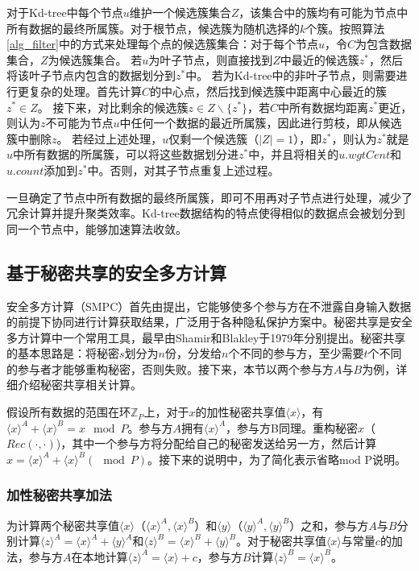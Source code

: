 对于Kd-tree中每个节点$ u $维护一个候选簇集合$ Z $，该集合中的簇均有可能为节点中所有数据的最终所属簇。对于根节点，候选簇为随机选择的$ k $个簇。按照算法\ref{alg_filter}中的方式来处理每个点的候选簇集合：对于每个节点$ u $，令$ C $为包含数据集合，$ Z $为候选簇集合。
若$ u $为叶子节点，则直接找到$ Z $中最近的候选簇$ z^* $，然后将该叶子节点内包含的数据划分到$ z^* $中。
若为Kd-tree中的非叶子节点，则需要进行更复杂的处理。首先计算$ C $的中心点，然后找到候选簇中距离中心最近的簇$ z^*\in Z $。
接下来，对比剩余的候选簇$ z\in Z\backslash\{z^*\} $，若$ C $中所有数据均距离$ z^* $更近，则认为$ z $不可能为节点$ u $中任何一个数据的最近所属簇，因此进行剪枝，即从候选簇中删除$ z $。
若经过上述处理，$ u $仅剩一个候选簇（$ |Z|=1 $），即$ z^* $，则认为$ z^* $就是$ u $中所有数据的所属簇，可以将这些数据划分进$ z^* $中，并且将相关的$ u.wgtCent $和$ u.count $添加到$ z^* $中。否则，对其子节点重复上述过程。

一旦确定了节点中所有数据的最终所属簇，即可不用再对子节点进行处理，减少了冗余计算并提升聚类效率。Kd-tree数据结构的特点使得相似的数据点会被划分到同一个节点中，能够加速算法收敛。

\subsection{基于秘密共享的安全多方计算}
安全多方计算（SMPC）首先由\cite{yao1986generate}提出，它能够使多个参与方在不泄露自身输入数据的前提下协同进行计算获取结果，广泛用于各种隐私保护方案中。秘密共享是安全多方计算中一个常用工具，最早由Shamir\cite{rivest2001leak}和Blakley\cite{blakley1979safeguarding}于1979年分别提出。秘密共享的基本思路是：将秘密$ s $划分为$ n $份，分发给$ n $个不同的参与方，至少需要$ t $个不同的参与者才能够重构秘密，否则失败。接下来，本节以两个参与方$ A $与$ B $为例，详细介绍秘密共享相关计算。

假设所有数据的范围在环$ \mathbb{Z}_P $上，对于$ x $的加性秘密共享值$ \langle x \rangle $，有$ \langle x \rangle^A + \langle x \rangle^B = x\mod P$。参与方$ A $拥有$ \langle x \rangle^A $，参与方B同理。重构秘密$ x $（$ Rec(\cdot, \cdot) $)，其中一个参与方将分配给自己的秘密发送给另一方，然后计算$ x=\langle x\rangle^A+\langle x\rangle^B(\mod P) $。接下来的说明中，为了简化表示省略mod P说明。

\subsubsection{加性秘密共享加法}
为计算两个秘密共享值$ \langle x \rangle $（$ \langle x \rangle^A,\langle x \rangle^B $）和$ \langle y \rangle $（$ \langle y\rangle^A,\langle y\rangle^B $）之和，参与方$ A $与$ B $分别计算$\langle z\rangle^A=\langle x\rangle^A+\langle y\rangle^A$和$\langle z\rangle^B=\langle x\rangle^B+\langle y\rangle^B$。对于秘密共享值$ \langle x \rangle $与常量$ c $的加法，参与方$ A $在本地计算$\langle z\rangle^A=\langle x\rangle+c$，参与方$ B $计算$\langle z\rangle^B=\langle x\rangle^B$。
